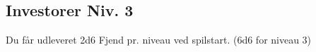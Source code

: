 \subsection*{Investorer Niv. 3}
Du får udleveret 2d6 Fjend pr. niveau ved spilstart. (6d6 for niveau 3)\\
